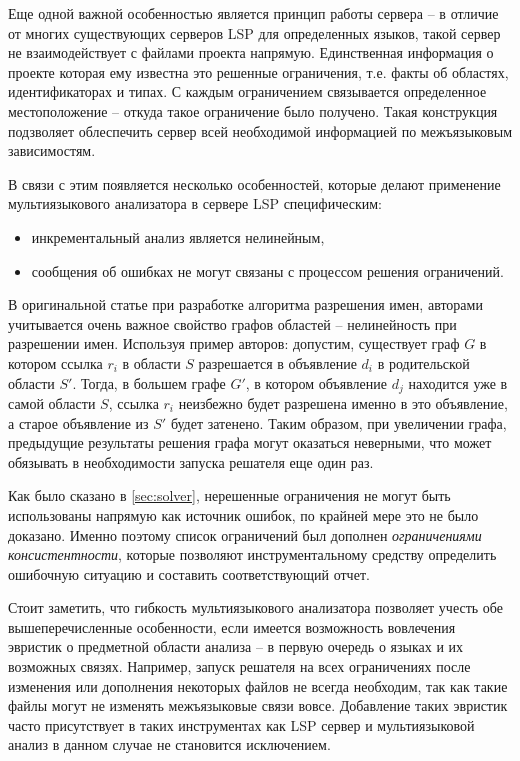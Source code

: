 Еще одной важной особенностью является принцип работы сервера -- в отличие от многих существующих серверов LSP для
определенных языков, такой сервер не взаимодействует с файлами проекта напрямую. Единственная информация о проекте
которая ему известна это решенные ограничения, т.е. факты об областях, идентификаторах и типах. С каждым ограничением
связывается определенное местоположение -- откуда такое ограничение было получено. Такая конструкция подзволяет
облеспечить сервер всей необходимой информацией по межъязыковым зависимостям.

В связи с этим появляется несколько особенностей, которые делают применение мультиязыкового анализатора в сервере LSP
специфическим:
\begin{itemize}
    \item инкрементальный анализ является нелинейным,
    \item сообщения об ошибках не могут связаны с процессом решения ограничений.
\end{itemize}

В оригинальной статье \cite{scope-graphs-static-analysis} при разработке алгоритма разрешения имен, авторами
учитывается очень важное свойство графов областей -- нелинейность при разрешении имен. Используя пример авторов:
допустим, существует граф $G$ в котором ссылка $r_i$ в области $S$ разрешается в объявление $d_i$ в родительской области $S'$.
Тогда, в большем графе $G'$, в котором объявление $d_j$ находится уже в самой области $S$, ссылка $r_i$ неизбежно
будет разрешена именно в это объявление, а старое объявление из $S'$ будет затенено.
Таким образом, при увеличении графа, предыдущие результаты решения графа могут оказаться неверными, что
может обязывать в необходимости запуска решателя еще один раз.

Как было сказано в \ref{sec:solver}, нерешенные ограничения не могут быть использованы напрямую как источник
ошибок, по крайней мере это не было доказано. Именно поэтому список ограничений был дополнен \textit{ограничениями консистентности},
которые позволяют инструментальному средству определить ошибочную ситуацию и составить соответствующий отчет.

Стоит заметить, что гибкость мультиязыкового анализатора позволяет учесть обе вышеперечисленные особенности,
если имеется возможность вовлечения эвристик о предметной области анализа -- в первую очередь о языках и
их возможных связях. Например, запуск решателя на всех ограничениях после изменения или дополнения некоторых файлов не всегда
необходим, так как такие файлы могут не изменять межъязыковые связи вовсе. Добавление таких эвристик
часто присутствует в таких инструментах как LSP сервер и мультиязыковой анализ в данном случае не становится исключением.

